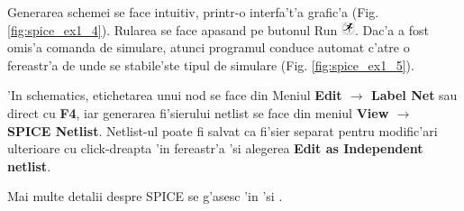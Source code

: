 Generarea schemei se face intuitiv, printr-o interfa't'a grafic'a (Fig. \ref{fig:spice_ex1_4}). Rularea se face apasand pe butonul Run \includegraphics[width=0.03\textwidth]{laborator_01/figuri/spice_Run_icon}. Dac'a a fost omis'a comanda de simulare, atunci programul conduce automat c'atre o fereastr'a de unde se stabile'ste tipul de simulare (Fig. \ref{fig:spice_ex1_5}).

'In schematics, etichetarea unui nod se face din Meniul \textbf{Edit $\rightarrow$ Label Net} sau direct cu \textbf{F4}, iar generarea fi'sierului netlist se face din meniul \textbf{View $\rightarrow$ SPICE Netlist}. Netlist-ul poate fi salvat ca fi'sier separat pentru modific'ari ulterioare cu click-dreapta 'in fereastr'a 'si alegerea \textbf{Edit as Independent netlist}.

Mai multe detalii despre SPICE se g'asesc 'in \cite{ltspice} 'si \cite{ltspicewiki}.


